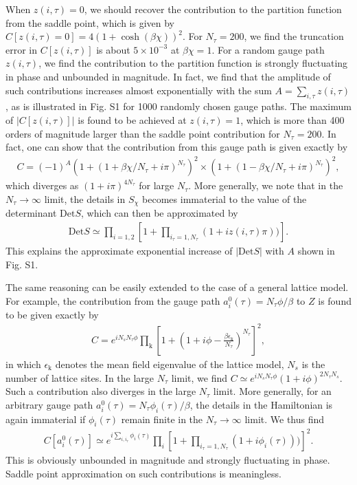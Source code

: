 \documentclass[12pt]{article}
\begin{document}
When $z(i,\tau)=0$, we should recover the contribution to the partition function from the saddle point, which is given by $C[z(i,\tau)=0]=4(1+\cosh(\beta\chi))^{2}$. For $N_{\tau}=200$, we find the truncation error in $C[z(i,\tau)]$ is about $5\times10^{-3}$ at $\beta\chi=1$.  For a random gauge path $z(i,\tau)$, we find the contribution to the partition function is strongly fluctuating in phase and unbounded in magnitude. In fact, we find that the amplitude of such contributions increases almost exponentially with the sum  $A=\sum_{i,\tau}z(i,\tau)$, as is illustrated in Fig. S1 for 1000 randomly chosen gauge paths. The maximum of $|C[z(i,\tau)]|$ is found to be achieved at $z(i,\tau)=1$, which is more than 400 orders of magnitude larger than the saddle point contribution for $N_{\tau}=200$. In fact, one can show that the contribution from this gauge path is given exactly by 
\begin{eqnarray}
C=(-1)^{A}(1+(1+\beta\chi/N_{\tau}+i\pi)^{N_{\tau}})^{2}\times(1+(1-\beta\chi/N_{\tau}+i\pi)^{N_{\tau}})^{2},\nonumber
\end{eqnarray}
which diverges as $(1+i\pi)^{4N_{\tau}}$ for large $N_{\tau}$. More generally, we note that in the $N_{\tau}\to \infty$ limit, the details in $S_{\chi}$ becomes immaterial to the value of the determinant $\mathrm{Det}S$, which can then be approximated by
\begin{eqnarray}
\mathrm{Det}S\simeq \prod_{i=1,2}[1+\prod_{i_{\tau}=1,N_{\tau}}(1+iz(i,\tau)\pi))].\nonumber
\end{eqnarray}
This explains the approximate exponential increase of $|\mathrm{Det}S|$ with $A$ shown in Fig. S1. 

The same reasoning can be easily extended to the case of a general lattice model. For example, the contribution from the gauge path $a^{0}_{i}(\tau)= N_{\tau}\phi/\beta$ to $Z$ is found to be given exactly by
\begin{eqnarray}
C=e^{iN_{s}N_{\tau}\phi}\prod_{\mathrm{k}}[1+(1+i\phi-\frac{\beta \epsilon_{\mathrm{k}}}{N_{\tau}})^{N_{\tau}}]^{2},\nonumber
\end{eqnarray}
in which $\epsilon_{\mathrm{k}}$ denotes the mean field eigenvalue of the lattice model, $N_{s}$ is the number of lattice sites. In the large $N_{\tau}$ limit, we find $C\simeq e^{iN_{s}N_{\tau}\phi}(1+i\phi)^{2N_{\tau}N_{s}}$. Such a contribution also diverges in the large $N_{\tau}$ limit. More generally, for an arbitrary gauge path $a^{0}_{i}(\tau)=N_{\tau}\phi_{i}(\tau)/\beta$, the details in the Hamiltonian is again immaterial if $\phi_{i}(\tau)$ remain finite in the $N_{\tau}\to \infty$ limit. We thus find
\begin{eqnarray}
C[a^{0}_{i}(\tau)]\simeq e^{i\sum_{i,i_{\tau}}\phi_{i}(\tau)}\prod_{i}[1+\prod_{i_{\tau}=1,N_{\tau}}(1+i\phi_{i}(\tau)))]^{2}.\nonumber
\end{eqnarray}
This is obviously unbounded in magnitude and strongly fluctuating in phase. Saddle point approximation on such contributions is meaningless.
\end{document}
